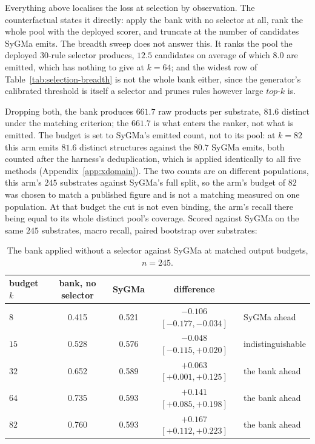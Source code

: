 Everything above localises the loss at selection by observation. The counterfactual states it
directly: apply the bank with no selector at all, rank the whole pool with the deployed scorer, and
truncate at the number of candidates SyGMa emits. The breadth sweep does not answer this. It ranks
the pool the deployed 30-rule selector produces, $12.5$ candidates on average of which $8.0$ are
emitted, which has nothing to give at $k=64$; and the widest row of Table~\ref{tab:selection-breadth} is not the whole bank
either, since the generator's calibrated threshold is itself a selector and prunes rules however
large $\mathit{top\text{-}k}$ is.

Dropping both, the bank produces $661.7$ raw products per substrate, $81.6$ distinct under the
matching criterion; the $661.7$ is what enters the ranker, not what is emitted. The budget is set to
SyGMa's emitted count, not to its pool: at $k=82$ this arm emits $81.6$ distinct structures
against the $80.7$ SyGMa emits, both counted after the harness's deduplication, which is applied
identically to all five methods (Appendix~\ref{app:xdomain}). The two counts are on different
populations, this arm's $245$ substrates against SyGMa's full split, so the arm's budget of $82$ was chosen
to match a published figure and is not a matching measured on one population. At that budget the cut is not even binding,
the arm's recall there being equal to its whole distinct pool's coverage. Scored against SyGMa on
the same $245$ substrates, macro recall, paired bootstrap over substrates:

\begin{table}[h]
\centering
\begin{tabular}{lcccl}
\toprule
budget $k$ & bank, no selector & SyGMa & difference & \\
\midrule
$8$  & 0.415 & 0.521 & $-0.106$ $[-0.177,-0.034]$ & SyGMa ahead \\
$15$ & 0.528 & 0.576 & $-0.048$ $[-0.115,+0.020]$ & indistinguishable \\
$32$ & 0.652 & 0.589 & $+0.063$ $[+0.001,+0.125]$ & the bank ahead \\
$64$ & 0.735 & 0.593 & $+0.141$ $[+0.085,+0.198]$ & the bank ahead \\
$82$ & 0.760 & 0.593 & $+0.167$ $[+0.112,+0.223]$ & the bank ahead \\
\bottomrule
\end{tabular}
\caption{The bank applied without a selector against SyGMa at matched output budgets, $n=245$.}
\label{tab:noselect}
\end{table}

